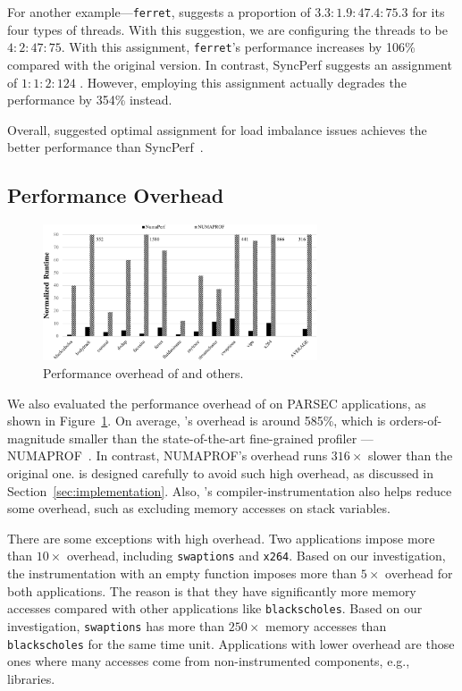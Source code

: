 For another example---\texttt{ferret}, \NP{} suggests a proportion of $3.3 :1.9 :47.4 :75.3$ for its four types of threads. With this suggestion, we are configuring the threads to be $4 : 2 : 47 : 75$. With this assignment, \texttt{ferret}'s performance increases by 106\% compared with the original version. In contrast, SyncPerf suggests an assignment of $1:1:2:124$
. However, employing this assignment actually degrades the performance by 354\% instead. 

Overall, \NP{} suggested optimal assignment for load imbalance issues achieves the better performance than SyncPerf~\cite{SyncPerf}. 

\subsection{Performance Overhead}
\label{sec:performance}
\begin{figure}[!h]
    \centering
    \includegraphics[width=3.2in]{paper/figures/performance.pdf}
    \caption{Performance overhead of \NP{} and others.\label{fig:performance}}  
\end{figure}


We also evaluated the performance overhead of \NP{} on PARSEC applications, as shown in Figure~\ref{fig:performance}. On average, \NP{}'s overhead is around 585\%, which is orders-of-magnitude smaller than the state-of-the-art fine-grained profiler --- NUMAPROF~\cite{valat:2018:numaprof}. In contrast, NUMAPROF's overhead runs $316\times$ slower than the original one. \NP{} is designed carefully to avoid such high overhead, as discussed in Section~\ref{sec:implementation}. Also, \NP{}'s compiler-instrumentation also helps reduce some overhead, such as excluding memory accesses on stack variables. 

There are some exceptions with high overhead. Two applications impose more than $10\times$ overhead, including \texttt{swaptions} and \texttt{x264}. Based on our investigation, the instrumentation with an empty function imposes more than $5\times$ overhead for both applications. The reason is that they have significantly more  memory accesses compared with other applications like \texttt{blackscholes}. Based on our investigation, \texttt{swaptions} has more than $250\times$ memory accesses than \texttt{blackscholes} for the same time unit. Applications with lower overhead are those ones where many accesses come from non-instrumented components, e.g., libraries. 

